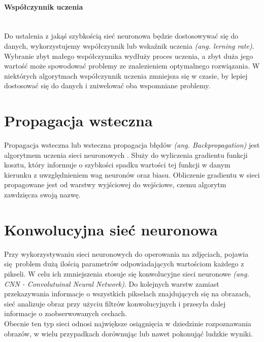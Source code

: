 \paragraph{Współczynnik uczenia} \mbox{}\\
Do ustalenia z jakąś szybkością sieć neuronowa będzie dostosowywać się do danych, wykorzystujemy
współczynnik lub wskaźnik uczenia \textit{(ang. lerning rate)}. Wybranie zbyt małego
współczynnika wydłuży proces uczenia, a zbyt duża jego wartość może spowodować problemy
ze znalezieniem optymalnego rozwiązania. W niektórych algorytmach współczynnik uczenia
zmniejsza się w czasie, by lepiej dostosować się do danych i zniwelować oba wspomniane problemy.

\section{Propagacja wsteczna}
Propagacja wsteczna lub wsteczna propagacja błędów \textit{(ang. Backpropagation)}
jest algorytmem uczenia sieci neuronowych \cite{CS231n_backprop, backprop}.
Służy do wyliczenia gradientu funkcji kosztu, który informuje o szybkości spadku wartości tej funkcji
w danym kierunku z uwzględnieniem wag neuronów oraz biasu. Obliczenie gradientu w sieci propagowane
jest od warstwy wyjściowej do wejściowe, czemu algorytm zawdzięcza swoją nazwę.

\section{Konwolucyjna sieć neuronowa}

Przy wykorzystywaniu sieci neuronowych do operowania na zdjęciach, pojawia się problem
dużą ilością parametrów odpowiadających wartościom każdego z pikseli.
W celu ich zmniejszenia stosuje się konwolucyjne sieci neuronowe \textit{(ang. CNN - Convolutuinal Neural Network)}.
Do kolejnych warstw zamiast przekazywania informacje o wszystkich pikselach znajdujących się
na obrazach, sieć analizuje obraz przy użyciu filtrów konwolucyjnych i
przesyła dalej informacje o zaobserwowanych cechach.\\
Obecnie ten typ sieci odnosi największe osiągnięcia w dziedzinie rozpoznawania obrazów,
w wielu przypadkach dorównując lub nawet pokonująć ludzkie wyniki.

